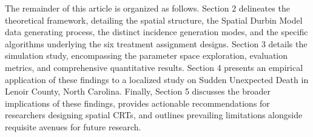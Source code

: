 \documentclass[11pt]{article}
\begin{document}
The remainder of this article is organized as follows. Section 2 delineates the theoretical framework, detailing the spatial structure, the Spatial Durbin Model data generating process, the distinct incidence generation modes, and the specific algorithms underlying the six treatment assignment designs. Section 3 details the simulation study, encompassing the parameter space exploration, evaluation metrics, and comprehensive quantitative results. Section 4 presents an empirical application of these findings to a localized study on Sudden Unexpected Death in Lenoir County, North Carolina. Finally, Section 5 discusses the broader implications of these findings, provides actionable recommendations for researchers designing spatial CRTs, and outlines prevailing limitations alongside requisite avenues for future research.



\end{document}
